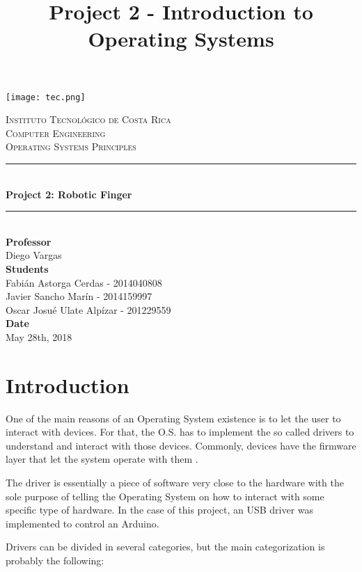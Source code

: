 \documentclass[12pt]{article}
\title{Project 2 - Introduction to Operating Systems}
\begin{document}
\begin{titlepage}


\newcommand{\HRule}{\rule{\linewidth}{0.5mm}}

\center

\texttt{[image: tec.png]}

\textsc{\large Instituto Tecnológico de Costa Rica}\\[1cm]
\textsc{\large Computer Engineering }\\[0.5cm]
\textsc{\large Operating Systems Principles}\\[0.5cm]


\HRule \\[0.5cm]
{ \huge \bfseries Project 2: Robotic Finger}\\[0.3cm]
\HRule \\[1cm]


\textbf{{\large Professor  }}\\[0,2cm]
{\large Diego Vargas}\\[0,7cm]

\textbf{{\large Students }}\\[0,2cm]
{\large Fabián Astorga Cerdas - 2014040808}\\[0,3cm]
{\large Javier Sancho Marín - 2014159997}\\[0,3cm]
{\large Oscar Josué Ulate Alpízar - 201229559}\\[0,7cm]

\textbf{{\large Date }}\\[0,2cm]
{\large May 28th, 2018}\\[2cm]


\end{titlepage}

\section{Introduction}
One of the main reasons of an Operating System existence is to let the user to interact with devices. For that, the O.S. has to implement the so called drivers to understand and interact with those devices. Commonly, devices have the firmware layer that let the system operate with them \cite{driver}.

The driver is essentially a piece of software very close to the hardware with the sole purpose of telling the Operating System on how to interact with some specific type of hardware. In the case of this project, an USB driver was implemented to control an Arduino.

Drivers can be divided in several categories, but the main categorization is probably the following:
\end{document}
